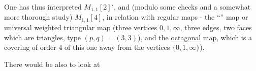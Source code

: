 One has thus interpreted $M_{1,1}[2]'$, and
(modulo some checks and a somewhat more thorough study)
$M_{1,1}[4]$, in relation with  regular
maps - the ``'' map
or universal weighted triangular map
(three vertices $0,1,\infty$,
three edges, two faces which are triangles, type
$(p,q)=(3,3)$), and the \uline{octagonal} map,
which is a covering of order $4$ of this one
\unsure{(}
away from the vertices $\{0,1,\infty\}$),

There would be  also to look at
